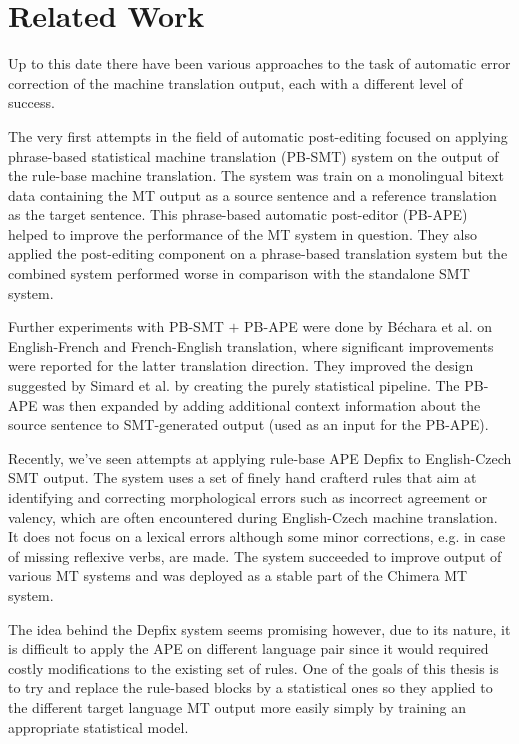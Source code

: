 \section{Related Work}


Up to this date there have been various approaches to the task of automatic
error correction of the machine translation output, each with a different level of success.

The very first attempts in the field of automatic post-editing\cite{simard2007rule}
focused on applying phrase-based statistical machine translation (PB-SMT)
system on the output of the rule-base machine translation. The system was train on a monolingual
bitext data containing the MT output as a source sentence and a reference translation as
the target sentence. This phrase-based automatic post-editor (PB-APE) helped to improve
the performance of the MT system in question. They also applied the post-editing component
on a phrase-based translation system but the combined system performed worse in comparison
with the standalone SMT system.

Further experiments with PB-SMT $+$ PB-APE were done by B\'{e}chara et al.\cite{bechara:2011}
on English-French and French-English translation, where significant improvements were reported
for the latter translation direction. They improved the design suggested by Simard et al. by
creating the purely statistical pipeline. The PB-APE was then expanded by adding additional
context information about the source sentence to SMT-generated output (used as an input for
the PB-APE).

Recently, we've seen attempts at applying rule-base APE Depfix\cite{depfix:2014} to English-Czech
SMT output. The system uses a set of finely hand crafterd rules that aim at identifying
and correcting morphological errors such as incorrect agreement or valency, which are
often encountered during English-Czech machine translation. It does not focus on a lexical errors
although some minor corrections, e.g. in case of missing reflexive verbs, are made. The system
succeeded to improve output of various MT systems and was deployed as a stable part of the
Chimera\cite{biblio:BoRoChimera2013} MT system.

The idea behind the Depfix system seems promising however, due to its nature, it is difficult
to apply the APE on different language pair since it would required costly modifications to the
existing set of rules. One of the goals of this thesis is to try and replace the rule-based blocks
by a statistical ones so they applied to the different target language MT output more easily simply
by training an appropriate statistical model.

